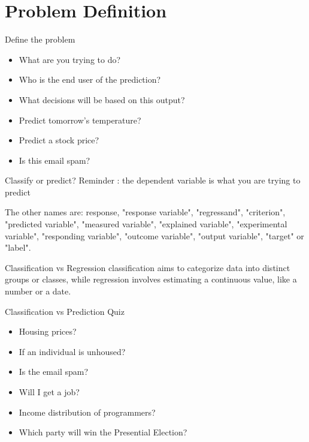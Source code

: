\documentclass[aspectratio=169]{beamer}
\begin{document}
\section{Problem Definition}
\label{sec:org066f0ec}
\begin{frame}[label={sec:orgceab127}]{Define the problem}
\begin{itemize}
\item What are you trying to do?
\item Who is the end user of the prediction?
\item What decisions will be based on this output?

\item Predict tomorrow's temperature?
\item Predict a stock price?
\item Is this email spam?
\end{itemize}
\end{frame}
\begin{frame}[label={sec:org5401cb6}]{Classify or predict?}
\alert{Reminder} : the dependent variable is what you are trying to
predict

The other names are: response, "response variable", "regressand",
"criterion", "predicted variable", "measured variable", "explained
variable", "experimental variable", "responding variable", "outcome
variable", "output variable", "target" or "label".
\end{frame}

\begin{frame}[label={sec:orgfbb06b6}]{Classification vs Regression}
\alert{classification} aims to categorize data into distinct groups or
classes, while \alert{regression} involves estimating a continuous value, like
a number or a date.
\end{frame}

\begin{frame}[label={sec:org6153aa9}]{Classification vs Prediction Quiz}
\begin{itemize}
\item Housing prices?
\item If an individual is unhoused?
\item Is the email spam?
\item Will I get a job?
\item Income distribution of programmers?
\item Which party will win the Presential Election?
\end{itemize}
\end{frame}
\end{document}
